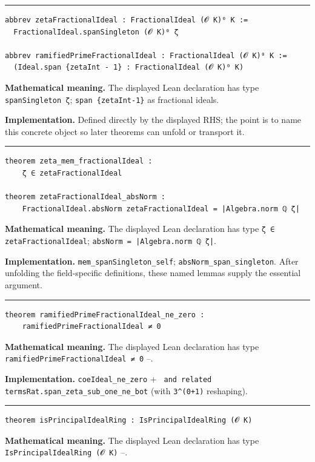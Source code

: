 \documentclass[UTF8,a4paper,11pt,fontset=fandol]{ctexart}
\theoremstyle{definition}
\newcommand{\statementsep}{\par\medskip\hrule\medskip}
\begin{document}
\statementsep
\begin{verbatim}
abbrev zetaFractionalIdeal : FractionalIdeal (𝓞 K)⁰ K :=
  FractionalIdeal.spanSingleton (𝓞 K)⁰ ζ

abbrev ramifiedPrimeFractionalIdeal : FractionalIdeal (𝓞 K)⁰ K :=
  (Ideal.span {zetaInt - 1} : FractionalIdeal (𝓞 K)⁰ K)
\end{verbatim}
\noindent\textbf{Mathematical meaning.} The displayed Lean declaration has type \texttt{spanSingleton ζ}; \texttt{span \{zetaInt-1\}} as fractional ideals.\par
\noindent\textbf{Implementation.} Defined directly by the displayed RHS; the point is to name this concrete object so later theorems can unfold or transport it.\par
\statementsep
\begin{verbatim}
theorem zeta_mem_fractionalIdeal :
    ζ ∈ zetaFractionalIdeal

theorem zetaFractionalIdeal_absNorm :
    FractionalIdeal.absNorm zetaFractionalIdeal = |Algebra.norm ℚ ζ|
\end{verbatim}
\noindent\textbf{Mathematical meaning.} The displayed Lean declaration has type \texttt{ζ ∈ zetaFractionalIdeal}; \texttt{absNorm = |Algebra.\allowbreak{}norm ℚ ζ|}.\par
\noindent\textbf{Implementation.} \texttt{mem\_\allowbreak{}spanSingleton\_\allowbreak{}self}; \texttt{absNorm\_\allowbreak{}span\_\allowbreak{}singleton}. After unfolding the field-specific definitions, these named lemmas supply the essential argument.\par
\statementsep
\begin{verbatim}
theorem ramifiedPrimeFractionalIdeal_ne_zero :
    ramifiedPrimeFractionalIdeal ≠ 0
\end{verbatim}
\noindent\textbf{Mathematical meaning.} The displayed Lean declaration has type \texttt{ramifiedPrimeFractionalIdeal ≠ 0} --.\par
\noindent\textbf{Implementation.} \texttt{coeIdeal\_\allowbreak{}ne\_\allowbreak{}zero} + \texttt{ and related termsRat.\allowbreak{}span\_\allowbreak{}zeta\_\allowbreak{}sub\_\allowbreak{}one\_\allowbreak{}ne\_\allowbreak{}bot} (with \texttt{3\textasciicircum{}(0+1)} reshaping).\par
\statementsep
\begin{verbatim}
theorem isPrincipalIdealRing : IsPrincipalIdealRing (𝓞 K)
\end{verbatim}
\noindent\textbf{Mathematical meaning.} The displayed Lean declaration has type \texttt{IsPrincipalIdealRing (𝓞 K)} --.\par
\end{document}
